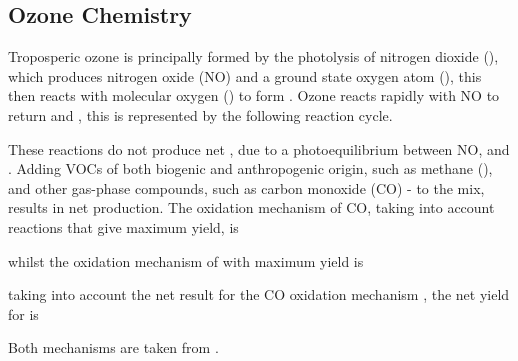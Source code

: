 \subsection{Ozone Chemistry}
Troposperic ozone is principally formed by the photolysis of nitrogen dioxide (), which produces nitrogen oxide (NO) 
and a ground state oxygen atom (), this then reacts with molecular oxygen () to form . Ozone reacts 
rapidly with NO to return  and , this is represented by the following reaction cycle.
\begin{reactionlist}
\end{reactionlist}
These reactions do not produce net , due to a photoequilibrium between NO,  and  \citep{Atkinson:2000}. 
Adding VOCs of both biogenic and anthropogenic origin, such as methane (), and other gas-phase compounds, such as 
carbon monoxide (CO) - to the mix, results in net  production. The oxidation mechanism of CO, taking into account 
reactions that give maximum  yield, is
\begin{reactionlist}
    \hline
\end{reactionlist}
whilst the oxidation mechanism of  with maximum  yield is
\begin{reactionlist}
    \hline
\end{reactionlist}
taking into account the net result for the CO oxidation mechanism , the net yield for  is
\begin{reactionlist}
\end{reactionlist}
Both mechanisms are taken from \citep{Seinfeld:2006}.

